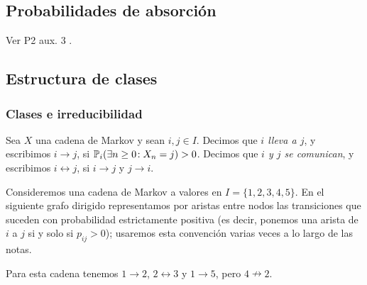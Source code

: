 \subsection{Probabilidades de absorción}\label{sec:absor}

Ver P2 aux. 3 \ucmark.


\subsection{Estructura de clases}

\subsubsection{Clases e irreducibilidad}

\begin{defn}
Sea $X$ una cadena de Markov y sean $i,j\in I$.
Decimos que \emph{$i$ lleva a $j$}, y escribimos $i\to j$, si $\mathbb{P}_i(\exists n\geq0\!:X_n=j)>0$.
Decimos que \emph{$i$ y $j$ se comunican}, y escribimos $i\leftrightarrow j$, si $i\to j$ y $j\to i$.
\end{defn}

\begin{ex}
Consideremos una cadena de Markov a valores en $I=\{1,2,3,4,5\}$.
En el siguiente grafo dirigido representamos por aristas entre nodos las transiciones que suceden con probabilidad estrictamente positiva (es decir, ponemos una arista de $i$ a $j$ si y solo si $p_{ij}>0$); usaremos esta convención varias veces a lo largo de las notas.
\begin{center}
\end{center}
Para esta cadena tenemos $1\to2$, $2\leftrightarrow3$ y $1\to5$, pero $4\nrightarrow2$.
\end{ex}

